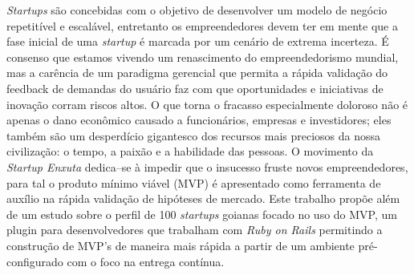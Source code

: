 
\begin{resumo} 
\emph{Startups} s\~ao concebidas com o objetivo de desenvolver um modelo de neg\'ocio repetit\'ivel e escal\'avel, entretanto os empreendedores devem ter em mente que a fase inicial de uma \emph{startup} \'e marcada por um cen\'ario de extrema incerteza. \'E consenso que estamos vivendo um renascimento do empreendedorismo mundial, mas a car\^encia de um paradigma gerencial que permita a r\'apida valida\c{c}\~ao do feedback de demandas do usu\'ario faz com que oportunidades e iniciativas de inova\c{c}\~ao corram riscos altos. O que torna o fracasso especialmente doloroso n\~ao \'e apenas o dano econ\^omico causado a funcion\'arios, empresas e investidores; eles tamb\'em s\~ao um desperd\'icio gigantesco dos recursos mais preciosos da nossa civiliza\c{c}\~ao: o tempo, a paix\~ao e a habilidade das pessoas. O movimento da \emph{Startup Enxuta} dedica--se \`a impedir que o insucesso fruste novos empreendedores, para tal o produto m\'inimo vi\'avel (MVP) \'e apresentado como ferramenta de aux\'ilio na r\'apida valida\c{c}\~ao de hip\'oteses de mercado. Este trabalho prop\~oe al\'em de um estudo sobre o perfil de 100 \emph{startups} goianas focado no uso do MVP, um plugin para desenvolvedores que trabalham com \emph{Ruby on Rails} permitindo a constru\c{c}\~ao de MVP's de maneira mais r\'apida a partir de um ambiente pr\'e-configurado com o foco na entrega cont\'inua.
\end{resumo}

